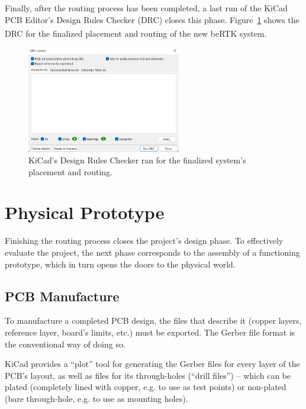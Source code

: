 Finally, after the routing process has been completed, a last run of the KiCad PCB Editor's Design Rules Checker (DRC) closes this phase. Figure~\ref{fig:DRC_errors} shows the DRC for the finalized placement and routing of the new beRTK\textsuperscript{\textregistered} system.

\begin{figure}[h]
	\centering
	\includegraphics[width=0.6\textwidth]{Chapters/Figures/chapter5/DRC.png}
	\caption{KiCad's Design Rules Checker ran for the finalized system's placement and routing.}
	\label{fig:DRC_errors}
\end{figure}

\section{Physical Prototype}\label{sec:53_Prototype}

Finishing the routing process closes the project's design phase. To effectively evaluate the project, the next phase corresponds to the assembly of a functioning prototype, which in turn opens the doors to the physical world.

\subsection{PCB Manufacture}\label{sec:531_PCBmanufacture}

To manufacture a completed PCB design, the files that describe it (copper layers, reference layer, board's limits, etc.) must be exported. The Gerber file format is the conventional way of doing so.

KiCad provides a ``plot'' tool for generating the Gerber files for every layer of the PCB's layout, as well as files for its through-holes (``drill files'') -- which can be plated (completely lined with copper, e.g. to use as test points) or non-plated (bare through-hole, e.g. to use as mounting holes).

